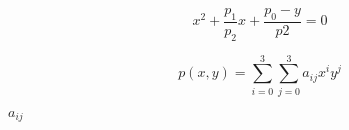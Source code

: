 \documentclass{article}
\begin{document}
\[x^2 + \frac{p_1}{p_2} x + \frac{p_0-y}{p2} = 0\]
\pagebreak

\[ p(x, y) = \sum_{i=0}^3 \sum_{j=0}^3 a_{ij} x^i y^j \]
\pagebreak

$a_{ij}$
\pagebreak
\end{document}
